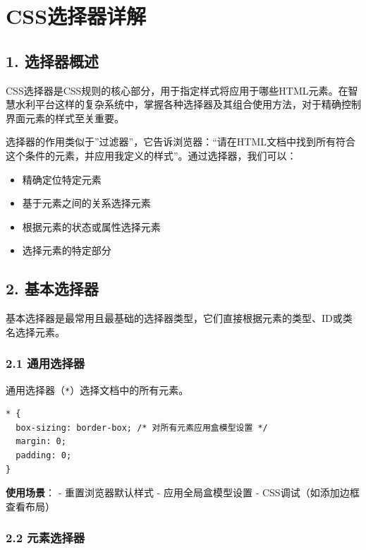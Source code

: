 \section{CSS选择器详解}\label{cssux9009ux62e9ux5668ux8be6ux89e3}

\subsection{1. 选择器概述}\label{ux9009ux62e9ux5668ux6982ux8ff0}

CSS选择器是CSS规则的核心部分，用于指定样式将应用于哪些HTML元素。在智慧水利平台这样的复杂系统中，掌握各种选择器及其组合使用方法，对于精确控制界面元素的样式至关重要。

选择器的作用类似于''过滤器''，它告诉浏览器：``请在HTML文档中找到所有符合这个条件的元素，并应用我定义的样式''。通过选择器，我们可以：

\begin{itemize}
\tightlist
\item
  精确定位特定元素
\item
  基于元素之间的关系选择元素
\item
  根据元素的状态或属性选择元素
\item
  选择元素的特定部分
\end{itemize}

\subsection{2. 基本选择器}\label{ux57faux672cux9009ux62e9ux5668}

基本选择器是最常用且最基础的选择器类型，它们直接根据元素的类型、ID或类名选择元素。

\subsubsection{2.1 通用选择器}\label{ux901aux7528ux9009ux62e9ux5668}

通用选择器（\passthrough{\lstinline!*!}）选择文档中的所有元素。

\begin{lstlisting}
* {
  box-sizing: border-box; /* 对所有元素应用盒模型设置 */
  margin: 0;
  padding: 0;
}
\end{lstlisting}

\textbf{使用场景}： - 重置浏览器默认样式 - 应用全局盒模型设置 -
CSS调试（如添加边框查看布局）

\subsubsection{2.2 元素选择器}\label{ux5143ux7d20ux9009ux62e9ux5668}

